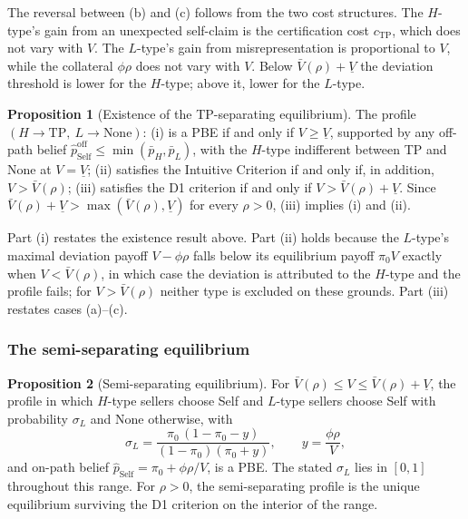 \documentclass[11pt,letterpaper]{article}
\theoremstyle{definition}
\newtheorem{proposition}{Proposition}[section]
\begin{document}
The reversal between (b) and (c) follows from the two cost structures. The $H$-type's gain from an unexpected self-claim is the certification cost $c_{\text{TP}}$, which does not vary with $V$. The $L$-type's gain from misrepresentation is proportional to $V$, while the collateral $\phi\rho$ does not vary with $V$. Below $\bar{V}(\rho) + \underline{V}$ the deviation threshold is lower for the $H$-type; above it, lower for the $L$-type.

\begin{proposition}[Existence of the TP-separating equilibrium]\label{prop:tp-existence}
The profile $(H \to \text{TP},\ L \to \text{None})$:
(i) is a PBE if and only if $V \geq \underline{V}$, supported by any off-path belief $\hat{p}_{\text{Self}}^{\text{off}} \leq \min(\bar{p}_H, \bar{p}_L)$, with the $H$-type indifferent between TP and None at $V = \underline{V}$;
(ii) satisfies the Intuitive Criterion if and only if, in addition, $V > \bar{V}(\rho)$;
(iii) satisfies the D1 criterion if and only if $V > \bar{V}(\rho) + \underline{V}$.
Since $\bar{V}(\rho) + \underline{V} > \max(\bar{V}(\rho), \underline{V})$ for every $\rho > 0$, (iii) implies (i) and (ii).
\end{proposition}

Part (i) restates the existence result above. Part (ii) holds because the $L$-type's maximal deviation payoff $V - \phi\rho$ falls below its equilibrium payoff $\pi_0 V$ exactly when $V < \bar{V}(\rho)$, in which case the deviation is attributed to the $H$-type and the profile fails; for $V > \bar{V}(\rho)$ neither type is excluded on these grounds. Part (iii) restates cases (a)--(c).

\subsubsection*{The semi-separating equilibrium}

\begin{proposition}[Semi-separating equilibrium]\label{prop:semisep}
For $\bar{V}(\rho) \leq V \leq \bar{V}(\rho) + \underline{V}$, the profile in which $H$-type sellers choose Self and $L$-type sellers choose Self with probability $\sigma_L$ and None otherwise, with
\[
\sigma_L = \frac{\pi_0\,(1 - \pi_0 - y)}{(1 - \pi_0)(\pi_0 + y)}, \qquad y = \frac{\phi\rho}{V},
\]
and on-path belief $\hat{p}_{\text{Self}} = \pi_0 + \phi\rho/V$, is a PBE. The stated $\sigma_L$ lies in $[0, 1]$ throughout this range. For $\rho > 0$, the semi-separating profile is the unique equilibrium surviving the D1 criterion on the interior of the range.
\end{proposition}
\end{document}
